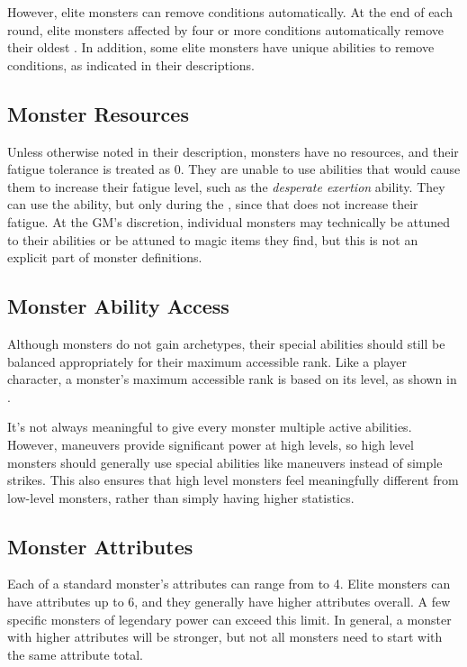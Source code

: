             However, elite monsters can remove conditions automatically.
            At the end of each round, elite monsters affected by four or more conditions automatically remove their oldest .
            In addition, some elite monsters have unique abilities to remove conditions, as indicated in their descriptions.

        \subsection{Monster Resources}
            Unless otherwise noted in their description, monsters have no resources, and their fatigue tolerance is treated as 0.
            They are unable to use abilities that would cause them to increase their fatigue level, such as the \textit{desperate exertion} ability.
            They can use the  ability, but only during the , since that does not increase their fatigue.
            At the GM's discretion, individual monsters may technically be attuned to their abilities or be attuned to magic items they find, but this is not an explicit part of monster definitions.

        \subsection{Monster Ability Access}\label{Monster Ability Access}
            Although monsters do not gain archetypes, their special abilities should still be balanced appropriately for their maximum accessible rank.
            Like a player character, a monster's maximum accessible rank is based on its level, as shown in .

            It's not always meaningful to give every monster multiple active abilities.
            However, maneuvers provide significant power at high levels, so high level monsters should generally use special abilities like maneuvers instead of simple strikes.
            This also ensures that high level monsters feel meaningfully different from low-level monsters, rather than simply having higher statistics.

    \subsection{Monster Attributes}\label{Monster Attributes}
        Each of a standard monster's attributes can range from  to 4.
        Elite monsters can have attributes up to 6, and they generally have higher attributes overall.
        A few specific monsters of legendary power can exceed this limit.
        In general, a monster with higher attributes will be stronger, but not all monsters need to start with the same attribute total.

